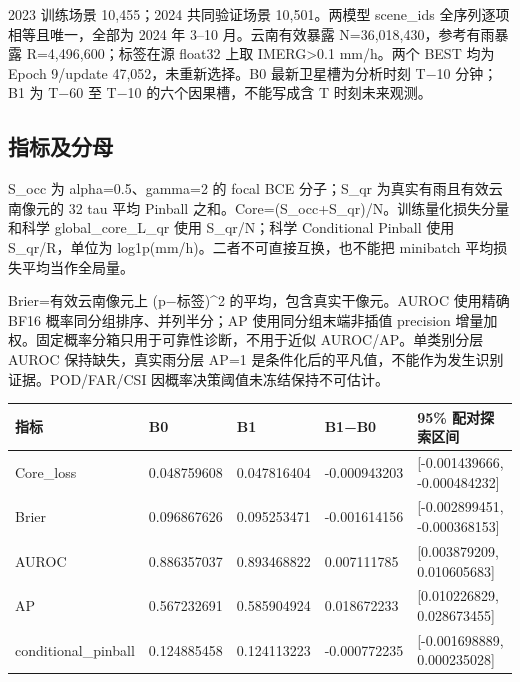 \documentclass[UTF8,a4paper,10pt,fontset=fandol]{ctexart}
\begin{document}
2023 训练场景 10,455；2024 共同验证场景 10,501。两模型 scene\_ids 全序列逐项相等且唯一，全部为 2024 年 3–10 月。云南有效暴露 N=36,018,430，参考有雨暴露 R=4,496,600；标签在源 float32 上取 IMERG>0.1 mm/h。两个 BEST 均为 Epoch 9/update 47,052，未重新选择。B0 最新卫星槽为分析时刻 T−10 分钟；B1 为 T−60 至 T−10 的六个因果槽，不能写成含 T 时刻未来观测。\par

\subsection*{指标及分母}

S\_occ 为 alpha=0.5、gamma=2 的 focal BCE 分子；S\_qr 为真实有雨且有效云南像元的 32 tau 平均 Pinball 之和。Core=(S\_occ+S\_qr)/N。训练量化损失分量和科学 global\_core\_L\_qr 使用 S\_qr/N；科学 Conditional Pinball 使用 S\_qr/R，单位为 log1p(mm/h)。二者不可直接互换，也不能把 minibatch 平均损失平均当作全局量。\par

Brier=有效云南像元上 (p−标签)\textasciicircum{}2 的平均，包含真实干像元。AUROC 使用精确 BF16 概率同分组排序、并列半分；AP 使用同分组末端非插值 precision 增量加权。固定概率分箱只用于可靠性诊断，不用于近似 AUROC/AP。单类别分层 AUROC 保持缺失，真实雨分层 AP=1 是条件化后的平凡值，不能作为发生识别证据。POD/FAR/CSI 因概率决策阈值未冻结保持不可估计。\par

\begin{center}\scriptsize\begin{longtable}{@{}p{}p{}p{}p{}p{}@{}}\toprule
指标 & B0 & B1 & B1−B0 & 95\% 配对探索区间\\
\midrule\endhead
Core\_loss & 0.048759608 & 0.047816404 & -0.000943203 & [-0.001439666, -0.000484232]\\
Brier & 0.096867626 & 0.095253471 & -0.001614156 & [-0.002899451, -0.000368153]\\
AUROC & 0.886357037 & 0.893468822 & 0.007111785 & [0.003879209, 0.010605683]\\
AP & 0.567232691 & 0.585904924 & 0.018672233 & [0.010226829, 0.028673455]\\
conditional\_pinball & 0.124885458 & 0.124113223 & -0.000772235 & [-0.001698889, 0.000235028]\\
\bottomrule\end{longtable}\end{center}\normalsize
\end{document}
